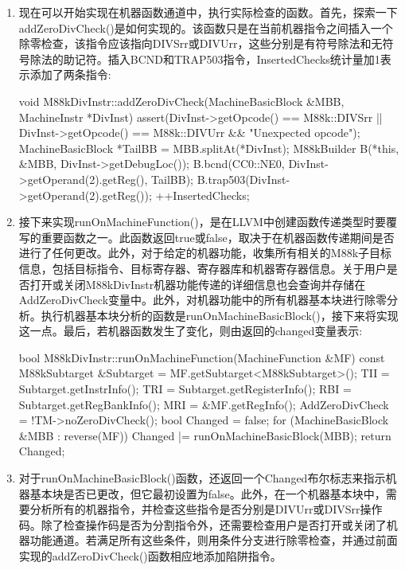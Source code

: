 \begin{enumerate}
\item
现在可以开始实现在机器函数通道中，执行实际检查的函数。首先，探索一下addZeroDivCheck()是如何实现的。该函数只是在当前机器指令之间插入一个除零检查，该指令应该指向DIVSrr或DIVUrr，这些分别是有符号除法和无符号除法的助记符。插入BCND和TRAP503指令，InsertedChecks统计量加1表示添加了两条指令:

\begin{cpp}
void M88kDivInstr::addZeroDivCheck(MachineBasicBlock &MBB,
                                   MachineInstr *DivInst) {
    assert(DivInst->getOpcode() == M88k::DIVSrr ||
            DivInst->getOpcode() == M88k::DIVUrr && "Unexpected
            opcode");
    MachineBasicBlock *TailBB = MBB.splitAt(*DivInst);
    M88kBuilder B(*this, &MBB, DivInst->getDebugLoc());
    B.bcnd(CC0::NE0, DivInst->getOperand(2).getReg(), TailBB);
    B.trap503(DivInst->getOperand(2).getReg());
    ++InsertedChecks;
}
\end{cpp}

\item
接下来实现runOnMachineFunction()，是在LLVM中创建函数传递类型时要覆写的重要函数之一。此函数返回true或false，取决于在机器函数传递期间是否进行了任何更改。此外，对于给定的机器功能，收集所有相关的M88k子目标信息，包括目标指令、目标寄存器、寄存器库和机器寄存器信息。关于用户是否打开或关闭M88kDivInstr机器功能传递的详细信息也会查询并存储在AddZeroDivCheck变量中。此外，对机器功能中的所有机器基本块进行除零分析。执行机器基本块分析的函数是runOnMachineBasicBlock()，接下来将实现这一点。最后，若机器函数发生了变化，则由返回的changed变量表示:

\begin{cpp}
bool M88kDivInstr::runOnMachineFunction(MachineFunction &MF) {
    const M88kSubtarget &Subtarget =
    MF.getSubtarget<M88kSubtarget>();
    TII = Subtarget.getInstrInfo();
    TRI = Subtarget.getRegisterInfo();
    RBI = Subtarget.getRegBankInfo();
    MRI = &MF.getRegInfo();
    AddZeroDivCheck = !TM->noZeroDivCheck();
    bool Changed = false;
    for (MachineBasicBlock &MBB : reverse(MF))
        Changed |= runOnMachineBasicBlock(MBB);
    return Changed;
}
\end{cpp}

\item
对于runOnMachineBasicBlock()函数，还返回一个Changed布尔标志来指示机器基本块是否已更改，但它最初设置为false。此外，在一个机器基本块中，需要分析所有的机器指令，并检查这些指令是否分别是DIVUrr或DIVSrr操作码。除了检查操作码是否为分割指令外，还需要检查用户是否打开或关闭了机器功能通道。若满足所有这些条件，则用条件分支进行除零检查，并通过前面实现的addZeroDivCheck()函数相应地添加陷阱指令。


\end{enumerate}
